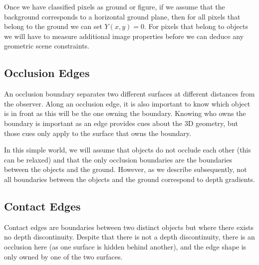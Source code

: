 Once we have classified pixels as ground or figure, if we assume that the background corresponds to a horizontal ground plane, then for all pixels that belong to the ground we can set $Y(x,y)=0$. For pixels that belong to objects we will have to measure additional image properties before we can deduce any geometric scene constraints. 



\subsection{Occlusion Edges}

An occlusion boundary separates two different surfaces at different distances from the observer. 
Along an occlusion edge, it is also important to know which object is in front as this will be the one owning the boundary. Knowing who owns the boundary
 is important as an edge provides cues about the 3D geometry, but those cues only apply to the surface that owns the boundary. 

In this simple world, we will assume that objects do not occlude each other (this can be relaxed) and that the only occlusion boundaries are the boundaries between the objects and the ground. However, as we describe subsequently, not all boundaries between the objects and the ground correspond to depth gradients.



\subsection{Contact Edges}

Contact edges are boundaries between two distinct objects but where there exists no depth discontinuity. Despite that there is not a depth discontinuity, there is an occlusion here (as one surface is hidden behind another), and the edge shape is only owned by one of the two surfaces. 

